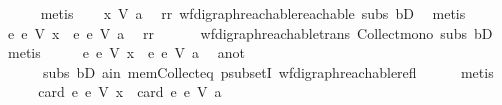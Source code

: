 \begin{isabellebody}
\ \ \ \ \isamarkupfalse%
\ metis\isanewline
\ \ \isamarkupfalse%
\ {\isachardoublequoteopen}x\ {\isasymrightarrow}\isactrlsup {\isacharasterisk}{\kern0pt}\isactrlbsub V\isactrlesub \ a{\isachardoublequoteclose}\ \isamarkupfalse%
\ rr\ wf{\isacharunderscore}{\kern0pt}digraph{\isachardot}{\kern0pt}reachable{}{\isacharunderscore}{\kern0pt}reachable\ subs\ bD{}\ \isamarkupfalse%
\ metis\isanewline
\ \ \isamarkupfalse%
\ \isamarkupfalse%
\ {\isachardoublequoteopen}{\isacharbraceleft}{\kern0pt}e{\isachardot}{\kern0pt}\ e\ {\isasymrightarrow}\isactrlsup {\isacharasterisk}{\kern0pt}\isactrlbsub V\isactrlesub \ x{\isacharbraceright}{\kern0pt}\ {\isasymsubseteq}\ {\isacharbraceleft}{\kern0pt}e{\isachardot}{\kern0pt}\ e\ {\isasymrightarrow}\isactrlsup {\isacharasterisk}{\kern0pt}\isactrlbsub V\isactrlesub \ a{\isacharbraceright}{\kern0pt}{\isachardoublequoteclose}\ \isamarkupfalse%
\ rr\isanewline
\ \ \ \ \ \ wf{\isacharunderscore}{\kern0pt}digraph{\isachardot}{\kern0pt}reachable{\isacharunderscore}{\kern0pt}trans\ Collect{\isacharunderscore}{\kern0pt}mono\ subs\ bD{}\ \isamarkupfalse%
\ metis\isanewline
\ \ \isamarkupfalse%
\ \isamarkupfalse%
\ {\isachardoublequoteopen}{\isacharbraceleft}{\kern0pt}e{\isachardot}{\kern0pt}\ e\ {\isasymrightarrow}\isactrlsup {\isacharasterisk}{\kern0pt}\isactrlbsub V\isactrlesub \ x{\isacharbraceright}{\kern0pt}\ {\isasymsubset}\ {\isacharbraceleft}{\kern0pt}e{\isachardot}{\kern0pt}\ e\ {\isasymrightarrow}\isactrlsup {\isacharasterisk}{\kern0pt}\isactrlbsub V\isactrlesub \ a{\isacharbraceright}{\kern0pt}{\isachardoublequoteclose}\ \isamarkupfalse%
\ a{\isacharunderscore}{\kern0pt}not\isanewline
\ \ \ \ \ \ subs\ bD{}\ a{\isacharunderscore}{\kern0pt}in\ mem{\isacharunderscore}{\kern0pt}Collect{\isacharunderscore}{\kern0pt}eq\ psubsetI\ wf{\isacharunderscore}{\kern0pt}digraph{\isachardot}{\kern0pt}reachable{\isacharunderscore}{\kern0pt}refl\isanewline
\ \ \ \ \isamarkupfalse%
\ metis\ \isanewline
\ \ \isamarkupfalse%
\ \isamarkupfalse%
\ {\isachardoublequoteopen}card\ {\isacharbraceleft}{\kern0pt}e{\isachardot}{\kern0pt}\ e\ {\isasymrightarrow}\isactrlsup {\isacharasterisk}{\kern0pt}\isactrlbsub V\isactrlesub \ x{\isacharbraceright}{\kern0pt}\ {\isacharless}{\kern0pt}\ card\ {\isacharbraceleft}{\kern0pt}e{\isachardot}{\kern0pt}\ e\ {\isasymrightarrow}\isactrlsup {\isacharasterisk}{\kern0pt}\isactrlbsub V\isactrlesub \ a{\isacharbraceright}{\kern0pt}{\isachardoublequoteclose}\ \isamarkupfalse%

\end{isabellebody}
